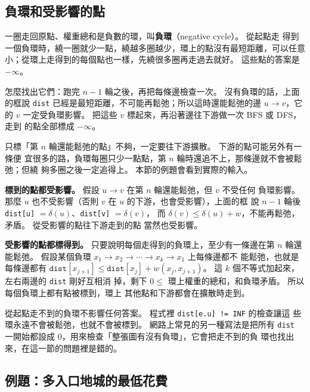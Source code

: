 \subsection{負環和受影響的點}
\label{sec:sp-negcycle}

一圈走回原點、權重總和是負數的環，叫\textbf{負環}（negative cycle）。 從起點走
得到一個負環時，繞一圈就少一點，繞越多圈越少，環上的點沒有最短距離，可以任意
小；從環上走得到的每個點也一樣，先繞很多圈再走過去就好。 這些點的答案是
$-\infty$。

怎麼找出它們：跑完 $n - 1$ 輪之後，再把每條邊檢查一次。 沒有負環的話，上面的框說
\texttt{dist} 已經是最短距離，不可能再鬆弛；所以這時還能鬆弛的邊 $u \to v$，它
的 $v$ 一定受負環影響。 把這些 $v$ 標起來，再沿著邊往下游做一次 BFS 或 DFS，走到
的點全部標成 $-\infty$。

只標「第 $n$ 輪還能鬆弛的點」不夠，一定要往下游擴散。 下游的點可能另外有一條便
宜很多的路，負環每圈只少一點點，第 $n$ 輪時還追不上，那條邊就不會被鬆弛；但繞
夠多圈之後一定追得上。 本節的例題會看到實際的輸入。

\begin{whybox}
\textbf{標到的點都受影響。} 假設 $u \to v$ 在第 $n$ 輪還能鬆弛，但 $v$ 不受任何
負環影響。 那麼 $u$ 也不受影響（否則 $v$ 在 $u$ 的下游，也會受影響），上面的框
說 $n - 1$ 輪後 \texttt{dist[u]} $= \delta(u)$、\texttt{dist[v]} $= \delta(v)$，
而 $\delta(v) \le \delta(u) + w$，不能再鬆弛，矛盾。 從受影響的點往下游走到的點
當然也受影響。

\textbf{受影響的點都標得到。} 只要說明每個走得到的負環上，至少有一條邊在第 $n$
輪還能鬆弛。 假設某個負環 $x_1 \to x_2 \to \cdots \to x_k \to x_1$ 上每條邊都不
能鬆弛，也就是每條邊都有 $\texttt{dist}[x_{j+1}] \le \texttt{dist}[x_j] +
w(x_j, x_{j+1})$。 這 $k$ 個不等式加起來，左右兩邊的 \texttt{dist} 剛好互相消
掉，剩下 $0 \le$ 環上權重的總和，和負環矛盾。 所以每個負環上都有點被標到，環上
其他點和下游都會在擴散時走到。
\end{whybox}

從起點走不到的負環不影響任何答案。 程式裡 \texttt{dist[e.u] != INF} 的檢查讓這
些環永遠不會被鬆弛，也就不會被標到。 網路上常見的另一種寫法是把所有
\texttt{dist} 一開始都設成 $0$，用來檢查「整張圖有沒有負環」，它會把走不到的負
環也找出來，在這一節的問題裡是錯的。

\subsection{例題：多入口地城的最低花費}
\label{sec:ex-dungeon}

